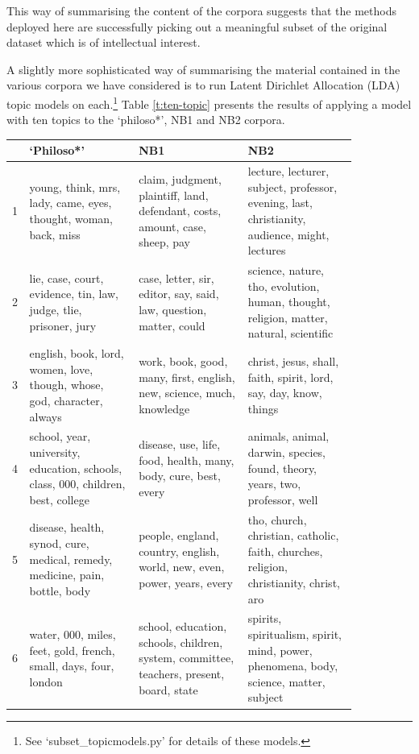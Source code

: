 \documentclass{article}
\begin{document}
This way of summarising the content of the corpora suggests that the methods deployed here are successfully picking out a meaningful subset of the original dataset which is of intellectual interest.

A slightly more sophisticated way of summarising the material contained in the various corpora we have considered is to run Latent Dirichlet Allocation (LDA) topic models on each.\footnote{
See `subset\_\-topicmodels.py' for details of these models.
} Table \ref{t:ten-topic} presents the results of applying a model with ten topics to the `philoso*', NB1 and NB2 corpora.

\begin{table}[]
        \centering
        \begin{tabular}{p{0.01\linewidth}|p{0.28\linewidth}| p{0.28\linewidth}| p{0.28\linewidth}}
          & \textbf{`Philoso*'} & \textbf{NB1} & \textbf{NB2}
          \\ \hline
          1 & young, think, mrs, lady, came, eyes, thought, woman, back, miss	& claim, judgment, plaintiff, land, defendant, costs, amount, case, sheep, pay & lecture, lecturer, subject, professor, evening, last, christianity, audience, might, lectures \\
          2	& lie, case, court, evidence, tin, law, judge, tlie, prisoner, jury & case, letter, sir, editor, say, said, law, question, matter, could & science, nature, tho, evolution, human, thought, religion, matter, natural, scientific \\
          3	& english, book, lord, women, love, though, whose, god, character, always & work, book, good, many, first, english, new, science, much, knowledge & christ, jesus, shall, faith, spirit, lord, say, day, know, things \\
          4	& school, year, university, education, schools, class, 000, children, best, college & disease, use, life, food, health, many, body, cure, best, every & animals, animal, darwin, species, found, theory, years, two, professor, well \\
          5	& disease, health, synod, cure, medical, remedy, medicine, pain, bottle, body & people, england, country, english, world, new, even, power, years, every & tho, church, christian, catholic, faith, churches, religion, christianity, christ, aro \\
          6	& water, 000, miles, feet, gold, french, small, days, four, london & school, education, schools, children, system, committee, teachers, present, board, state & spirits, spiritualism, spirit, mind, power, phenomena, body, science, matter, subject \\

\end{tabular}
\end{table}
\end{document}
